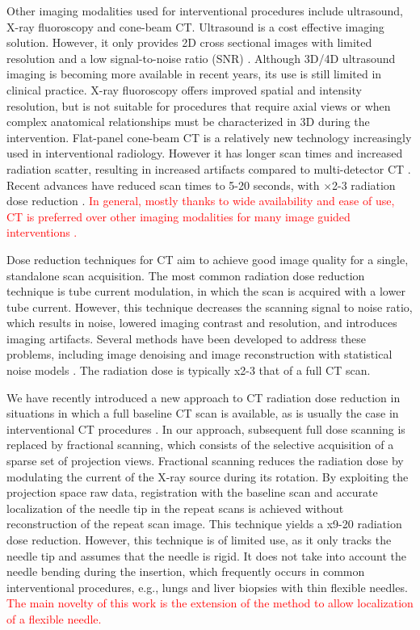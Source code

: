 Other imaging modalities used for interventional procedures include ultrasound, X-ray fluoroscopy and cone-beam CT.
Ultrasound is a cost effective imaging solution. However, it only provides 2D cross sectional images with limited resolution and a low signal-to-noise ratio (SNR) \cite{sheafor2000comparison}. Although 3D/4D ultrasound imaging is becoming more available in recent years, its use is still limited in clinical practice.
X-ray fluoroscopy offers improved spatial and intensity resolution, but is not suitable for procedures that require axial views or when complex anatomical relationships must be characterized in 3D during the intervention.
Flat-panel cone-beam CT is a relatively new technology increasingly used in interventional radiology. However it has longer scan times and increased radiation scatter, resulting in increased artifacts compared to multi-detector CT \cite{orth2008cbct}. Recent advances have reduced scan times to 5-20 seconds, with $\times$2-3 radiation dose reduction \cite{dynact}.
\textcolor{red}{In general, mostly thanks to wide availability and ease of use, CT is preferred over other imaging modalities for many image guided interventions \cite{gupta2014ct}.}

Dose reduction techniques for CT aim to achieve good image quality for a single, standalone scan acquisition. The most common radiation dose reduction technique is tube current modulation, in which the scan is acquired with a lower tube current. However, this technique decreases the scanning signal to noise ratio, which results in noise, lowered imaging contrast and resolution, and introduces imaging artifacts. Several methods have been developed to address these problems, including image denoising \cite{manduca2009projection} and image reconstruction with statistical noise models  \cite{zhang2016statistical,kim2015sparseview,niu2014sparse,liu2014total}. The radiation dose is typically x2-3 that of a full CT scan. 

We have recently introduced a new approach to CT radiation dose reduction in situations in which a full baseline CT scan is available, as is usually the case in interventional CT procedures \cite{medan2017sparse, medan2017reduced}. In our approach, subsequent full dose scanning is replaced by fractional scanning, which consists of the selective acquisition of a sparse set of projection views. Fractional scanning reduces the radiation dose by modulating the current of the X-ray source during its rotation. By exploiting the projection space raw data, registration with the baseline scan and accurate localization of the needle tip in the repeat scans is achieved without reconstruction of the repeat scan  image. This technique yields a x9-20 radiation dose reduction. However, this technique is of limited use, as it only tracks the needle tip and assumes that the needle is rigid. It does not take into account the needle bending during the insertion, which frequently occurs in common interventional procedures, e.g., lungs and liver biopsies with thin flexible needles. \textcolor{red}{The main novelty of this work is the extension of the method to allow localization of a flexible needle.}

